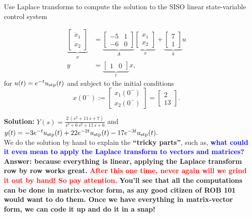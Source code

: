  \begin{example} Use Laplace transforms to compute the solution to the SISO linear state-variable control system

 \begin{equation}
    \label{eq:SolveStateVariableODEviaLaplaceTransform}
    \begin{aligned}
\underbrace{\left[ \begin{array}{c}
    \dot{x}_1\\
    \dot{x}_2
\end{array} \right]}_{\dot x} &=  
\underbrace{\left[ \begin{array}{rr}
-5& 1\\[1em]
-6 & 0
\end{array} \right]}_{A}  \underbrace{\left[ \begin{array}{c}
   x_1\\
    x_2
\end{array} \right]}_{x} + 
\underbrace{\left[ \begin{array}{c}
7\\
1
\end{array}
\right]}_{b} u \\
y & =  \underbrace{\left[ \begin{array}{cc}
1 & 0
\end{array}
\right]}_{c} x,
    \end{aligned}
\end{equation}
for $u(t) = e^{-t} u_{\rm stp}(t)$ and subject to the initial conditions 
$$x(0^-):=\left[ \begin{array}{c}
x_1(0^-) \\
x_2(0^-)
\end{array}
\right] = \left[ \begin{array}{r}
2 \\
13
\end{array}
\right].$$     
 \end{example}
\textbf{Solution:} \quad \Ans \quad $Y(s) = \frac{2  \, \left( s^{2} + 11  \, s + 7 \right)}{s^{3} + 6  \, s^{2} + 11  \, s + 6}$ \quad and \quad $y(t) = -3  e^{-t} u_{\rm stp}(t) + 22 e^{-2t} u_{\rm stp}(t)  - 17 e^{-3t} u_{\rm stp}(t).$\\

We do the solution by hand to explain the \textbf{``tricky parts''}, such as, \textcolor{blue}{\bf what could it even mean to apply the Laplace transform to vectors and matrices?} \textbf{Answer: because everything is linear, applying the Laplace transform row by row works great.} \textcolor{red}{\bf After this one time, never again will we grind it out by hand! So pay attention.} \textbf{You'll see that all the computations can be done in matrix-vector form, as any good citizen of ROB 101 would want to do them. Once we have everything in matrix-vector form, we can code it up and do it in a snap!}\\

